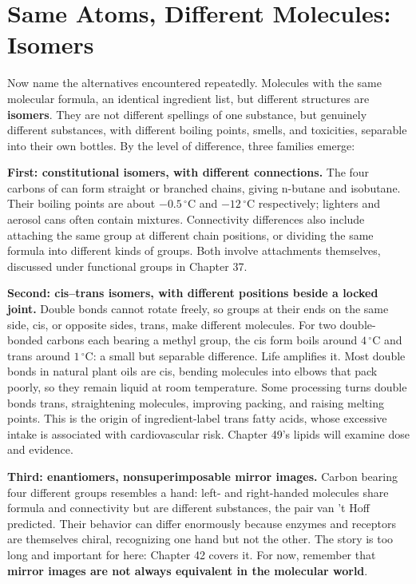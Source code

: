 \section{Same Atoms, Different Molecules: Isomers}

Now name the alternatives encountered repeatedly. Molecules with the same molecular formula, an identical ingredient list, but different structures are \textbf{isomers}. They are not different spellings of one substance, but genuinely different substances, with different boiling points, smells, and toxicities, separable into their own bottles. By the level of difference, three families emerge:

\textbf{First: constitutional isomers, with different connections.} The four carbons of  can form straight or branched chains, giving n-butane and isobutane. Their boiling points are about $-0.5\,^{\circ}\mathrm{C}$ and $-12\,^{\circ}\mathrm{C}$ respectively; lighters and aerosol cans often contain mixtures. Connectivity differences also include attaching the same group at different chain positions, or dividing the same formula into different kinds of groups. Both involve attachments themselves, discussed under functional groups in Chapter 37.

\textbf{Second: cis--trans isomers, with different positions beside a locked joint.} Double bonds cannot rotate freely, so groups at their ends on the same side, cis, or opposite sides, trans, make different molecules. For two double-bonded carbons each bearing a methyl group, the cis form boils around $4\,^{\circ}\mathrm{C}$ and trans around $1\,^{\circ}\mathrm{C}$: a small but separable difference. Life amplifies it. Most double bonds in natural plant oils are cis, bending molecules into elbows that pack poorly, so they remain liquid at room temperature. Some processing turns double bonds trans, straightening molecules, improving packing, and raising melting points. This is the origin of ingredient-label trans fatty acids, whose excessive intake is associated with cardiovascular risk. Chapter 49's lipids will examine dose and evidence.

\textbf{Third: enantiomers, nonsuperimposable mirror images.} Carbon bearing four different groups resembles a hand: left- and right-handed molecules share formula and connectivity but are different substances, the pair van 't Hoff predicted. Their behavior can differ enormously because enzymes and receptors are themselves chiral, recognizing one hand but not the other. The story is too long and important for here: Chapter 42 covers it. For now, remember that \textbf{mirror images are not always equivalent in the molecular world}.

